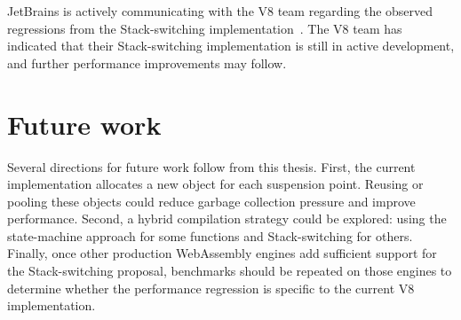 JetBrains is actively communicating with the V8 team regarding
the observed regressions from the Stack-switching implementation~\cite{wasm-stack-switching-repo}. The V8 team has
indicated that their Stack-switching implementation is still in active development, and further performance
improvements may follow.

\section*{Future work}

Several directions for future work follow from this thesis. First, the current implementation allocates a new
 object for each suspension point. Reusing or pooling these objects could reduce garbage
collection pressure and improve performance. Second, a hybrid compilation strategy could be explored: using the
state-machine approach for some functions and Stack-switching for others. Finally, once other production WebAssembly
engines add sufficient support for the Stack-switching proposal, benchmarks should be repeated on those engines to
determine whether the performance regression is specific to the current V8 implementation.
